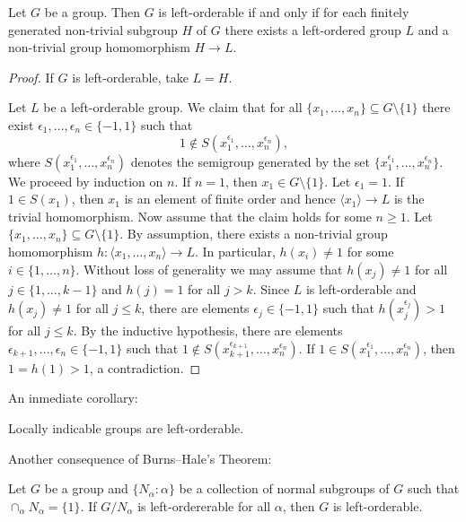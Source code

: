 \begin{theorem}
Let $G$ be a group. Then $G$ is left-orderable if and only if 
for each finitely generated non-trivial subgroup $H$ of $G$ there exists a left-ordered group $L$ 
and a non-trivial group homomorphism $H\to L$.  
\end{theorem}

\begin{proof}
	If $G$ is left-orderable, take $L=H$. 
	
	Let $L$ be a left-orderable group. We claim that for all $\{x_1,\dots,x_n\}\subseteq G\setminus\{1\}$ 
	there exist $\epsilon_1,\dots,\epsilon_n\in\{-1,1\}$ such that 
	\[
	1\not\in S(x_1^{\epsilon_1},\dots,x_n^{\epsilon_n}),
	\]
	where $S(x_1^{\epsilon_1},\dots,x_n^{\epsilon_n})$ denotes the semigroup generated by 
	the set $\{x_1^{\epsilon_1},\dots,x_n^{\epsilon_n}\}$. 
	We proceed by induction on $n$. If $n=1$, then $x_1\in G\setminus\{1\}$. Let $\epsilon_1=1$. If
	$1\in S(x_1)$, then $x_1$ is an element of finite order and hence $\langle x_1\rangle\to L$ is the trivial
	homomorphism. Now assume that the claim holds for some $n\geq 1$. Let $\{x_1,\dots,x_n\}\subseteq G\setminus\{1\}$. 
	By assumption, there exists a non-trivial group homomorphism 
	$h\colon\langle x_1,\dots,x_n\rangle\to L$. In particular, $h(x_i)\ne 1$ for some $i\in\{1,\dots,n\}$. Without loss
	of generality we may assume that $h(x_j)\ne 1$ for all $j\in\{1,\dots,k-1\}$ and 
	$h(j)=1$ for all $j>k$. Since $L$ is left-orderable and $h(x_j)\ne 1$ for all $j\leq k$, there
	are elements $\epsilon_j\in\{-1,1\}$ such that $h(x_j^{\epsilon_j})>1$ for all $j\leq k$. By the inductive hypothesis, 
	there are elements $\epsilon_{k+1},\dots,\epsilon_n\in\{-1,1\}$ such that 
	$1\not\in S(x_{k+1}^{\epsilon_{k+1}},\dots,x_n^{\epsilon_n})$. If $1\in S(x_1^{\epsilon_1},\dots,x_n^{\epsilon_n})$, then
	$1=h(1)>1$, a contradiction.       
\end{proof}

An inmediate corollary:

\begin{corollary}
	Locally indicable groups are left-orderable. 
\end{corollary}

Another consequence of Burns--Hale's Theorem:

\begin{exercise}
	Let $G$ be a group and $\{N_\alpha:\alpha\}$ be a collection of normal subgroups of $G$ such that
	$\cap_{\alpha}N_\alpha=\{1\}$. If $G/N_{\alpha}$ is left-ordererable for all $\alpha$, then 
	$G$ is left-orderable. 
\end{exercise}

